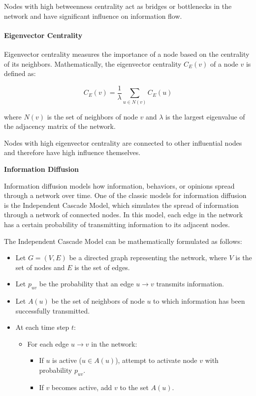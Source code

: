 \documentclass[12pt]{book} %
\begin{document}
Nodes with high betweenness centrality act as bridges or bottlenecks in the network and have significant influence on information flow.

\paragraph{Eigenvector Centrality}

Eigenvector centrality measures the importance of a node based on the centrality of its neighbors. Mathematically, the eigenvector centrality \(C_E(v)\) of a node \(v\) is defined as:

\[ C_E(v) = \frac{1}{\lambda} \sum_{u \in N(v)} C_E(u) \]

where \(N(v)\) is the set of neighbors of node \(v\) and \(\lambda\) is the largest eigenvalue of the adjacency matrix of the network.

Nodes with high eigenvector centrality are connected to other influential nodes and therefore have high influence themselves.

\textbf{Information Diffusion}

Information diffusion models how information, behaviors, or opinions spread through a network over time. One of the classic models for information diffusion is the Independent Cascade Model, which simulates the spread of information through a network of connected nodes. In this model, each edge in the network has a certain probability of transmitting information to its adjacent nodes.

The Independent Cascade Model can be mathematically formulated as follows:

\begin{itemize}
    \item Let \(G = (V, E)\) be a directed graph representing the network, where \(V\) is the set of nodes and \(E\) is the set of edges.
    \item Let \(p_{uv}\) be the probability that an edge \(u \rightarrow v\) transmits information.
    \item Let \(A(u)\) be the set of neighbors of node \(u\) to which information has been successfully transmitted.
    \item At each time step \(t\):
    \begin{itemize}
        \item For each edge \(u \rightarrow v\) in the network:
        \begin{itemize}
            \item If \(u\) is active (\(u \in A(u)\)), attempt to activate node \(v\) with probability \(p_{uv}\).
            \item If \(v\) becomes active, add \(v\) to the set \(A(u)\).
        \end{itemize}
    \end{itemize}
\end{itemize}
\end{document}
